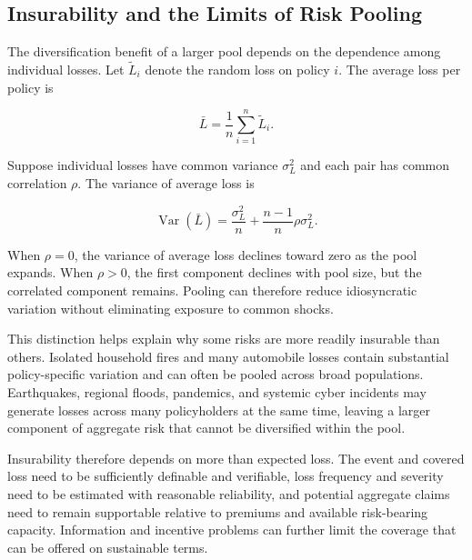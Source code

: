 \subsection{Insurability and the Limits of Risk Pooling}

The diversification benefit of a larger pool depends on the dependence among individual losses. Let $\tilde L_i$ denote the random loss on policy $i$. The average loss per policy is

\begin{equation}
\bar L=\frac{1}{n}\sum_{i=1}^{n}\tilde L_i.
\label{eq:ch15-average-loss}
\end{equation}

Suppose individual losses have common variance $\sigma_L^2$ and each pair has common correlation $\rho$. The variance of average loss is

\begin{equation}
\operatorname{Var}(\bar L)=
\frac{\sigma_L^2}{n}
+
\frac{n-1}{n}\rho\sigma_L^2.
\label{eq:ch15-correlated-pooling}
\end{equation}

When $\rho=0$, the variance of average loss declines toward zero as the pool expands. When $\rho>0$, the first component declines with pool size, but the correlated component remains. Pooling can therefore reduce idiosyncratic variation without eliminating exposure to common shocks.

This distinction helps explain why some risks are more readily insurable than others. Isolated household fires and many automobile losses contain substantial policy-specific variation and can often be pooled across broad populations. Earthquakes, regional floods, pandemics, and systemic cyber incidents may generate losses across many policyholders at the same time, leaving a larger component of aggregate risk that cannot be diversified within the pool.

Insurability therefore depends on more than expected loss. The event and covered loss need to be sufficiently definable and verifiable, loss frequency and severity need to be estimated with reasonable reliability, and potential aggregate claims need to remain supportable relative to premiums and available risk-bearing capacity. Information and incentive problems can further limit the coverage that can be offered on sustainable terms.

